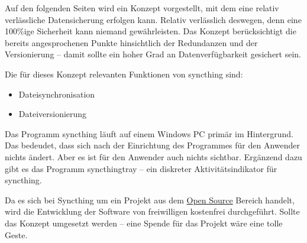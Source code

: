 Auf den folgenden Seiten wird ein Konzept vorgestellt, mit dem eine relativ
verlässliche Datensicherung erfolgen kann. Relativ verlässlich deswegen, denn
eine 100\%ige Sicherheit kann niemand gewährleisten. Das Konzept berücksichtigt
die bereits angesprochenen Punkte hinsichtlich der Redundanzen und der
Versionierung -- damit sollte ein hoher Grad an Datenverfügbarkeit gesichert
sein.
\bigskip

Die für dieses Konzept relevanten Funktionen von \gls{syncthing} sind:
\begin{itemize}
    \item Dateisynchronisation
    \item Dateiversionierung
\end{itemize}

 Das Programm \gls{syncthing} läuft auf einem Windows PC
primär im Hintergrund. Das bedeudet, dass sich nach der Einrichtung des Programmes
für den Anwender nichts ändert. Aber es ist für den Anwender auch nichts
sichtbar. Ergänzend dazu gibt es das Programm \gls{syncthingtray} -- ein
diskreter Aktivitätsindikator für \gls{syncthing}.
\bigskip

 Da es sich bei Syncthing um ein Projekt aus dem
\href{https://de.wikipedia.org/wiki/Open_Source}{Open Source} Bereich handelt,
wird die Entwicklung der Software von freiwilligen kostenfrei durchgeführt.
Sollte das Konzept umgesetzt werden -- eine Spende für das Projekt wäre eine
tolle Geste.
